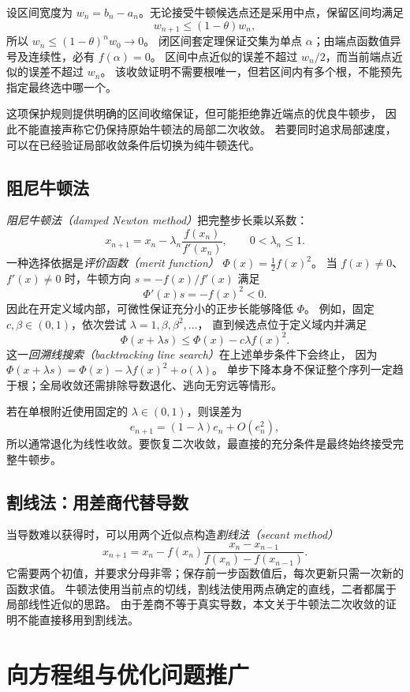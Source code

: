 \documentclass[UTF8,12pt,a4paper,fontset=fandol]{ctexart}
\begin{document}
设区间宽度为 $w_n=b_n-a_n$。无论接受牛顿候选点还是采用中点，保留区间均满足
\[
  w_{n+1}\le(1-\theta)w_n,
\]
所以 $w_n\le(1-\theta)^n w_0\to0$。
闭区间套定理保证交集为单点 $\alpha$；由端点函数值异号及连续性，必有 $f(\alpha)=0$。
区间中点近似的误差不超过 $w_n/2$，而当前端点近似的误差不超过 $w_n$。
该收敛证明不需要根唯一，但若区间内有多个根，不能预先指定最终选中哪一个。

这项保护规则提供明确的区间收缩保证，但可能拒绝靠近端点的优良牛顿步，
因此不能直接声称它仍保持原始牛顿法的局部二次收敛。
若要同时追求局部速度，可以在已经验证局部收敛条件后切换为纯牛顿迭代。

\subsection{阻尼牛顿法}

\emph{阻尼牛顿法（damped Newton method）}把完整步长乘以系数：
\[
  x_{n+1}=x_n-\lambda_n\frac{f(x_n)}{f'(x_n)},\qquad0<\lambda_n\le1.
\]
一种选择依据是\emph{评价函数（merit function）} $\Phi(x)=\frac12f(x)^2$。
当 $f(x)\ne0$、$f'(x)\ne0$ 时，牛顿方向 $s=-f(x)/f'(x)$ 满足
\[
  \Phi'(x)s=-f(x)^2<0.
\]
因此在开定义域内部，可微性保证充分小的正步长能够降低 $\Phi$。
例如，固定 $c,\beta\in(0,1)$，依次尝试 $\lambda=1,\beta,\beta^2,\ldots$，
直到候选点位于定义域内并满足
\[
  \Phi(x+\lambda s)\le\Phi(x)-c\lambda f(x)^2.
\]
这一\emph{回溯线搜索（backtracking line search）}在上述单步条件下会终止，
因为 $\Phi(x+\lambda s)=\Phi(x)-\lambda f(x)^2+o(\lambda)$。
单步下降本身不保证整个序列一定趋于根；全局收敛还需排除导数退化、逃向无穷远等情形。

若在单根附近使用固定的 $\lambda\in(0,1)$，则误差为
\[
  e_{n+1}=(1-\lambda)e_n+O(e_n^2),
\]
所以通常退化为线性收敛。要恢复二次收敛，最直接的充分条件是最终始终接受完整牛顿步。

\subsection{割线法：用差商代替导数}

当导数难以获得时，可以用两个近似点构造\emph{割线法（secant method）}
\[
  x_{n+1}=x_n-
  f(x_n)\frac{x_n-x_{n-1}}{f(x_n)-f(x_{n-1})}.
\]
它需要两个初值，并要求分母非零；保存前一步函数值后，每次更新只需一次新的函数求值。
牛顿法使用当前点的切线，割线法使用两点确定的直线，二者都属于局部线性近似的思路。
由于差商不等于真实导数，本文关于牛顿法二次收敛的证明不能直接移用到割线法。

\section{向方程组与优化问题推广}
\label{sec:newton-extensions}
\end{document}
